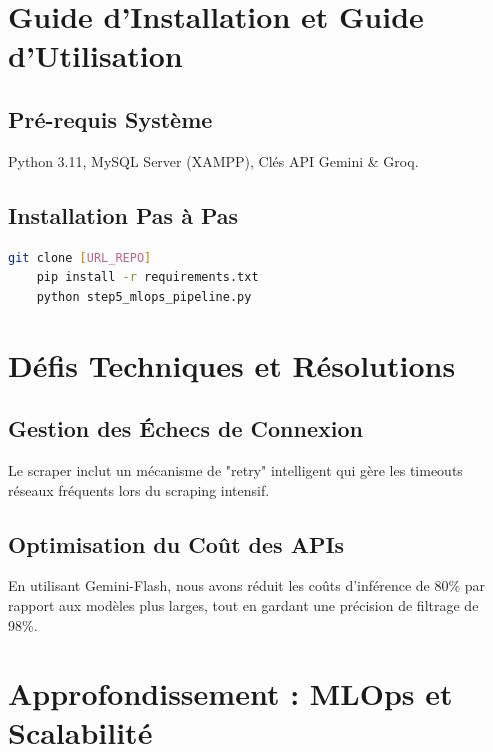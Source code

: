 \documentclass[11pt,a4paper,oneside]{report}
\begin{document}
    \chapter{Guide d'Installation et Guide d'Utilisation}
    \section{Pré-requis Système}
    Python 3.11, MySQL Server (XAMPP), Clés API Gemini & Groq.

    \section{Installation Pas à Pas}
    \begin{lstlisting}[language=bash]
    git clone [URL_REPO]
    pip install -r requirements.txt
    python step5_mlops_pipeline.py
    \end{lstlisting}

    \chapter{Défis Techniques et Résolutions}
    \section{Gestion des Échecs de Connexion}
    Le scraper inclut un mécanisme de "retry" intelligent qui gère les timeouts réseaux fréquents lors du scraping intensif.

    \section{Optimisation du Coût des APIs}
    En utilisant Gemini-Flash, nous avons réduit les coûts d'inférence de 80\% par rapport aux modèles plus larges, tout en gardant une précision de filtrage de 98\%.

    \chapter{Approfondissement : MLOps et Scalabilité}
\end{document}
